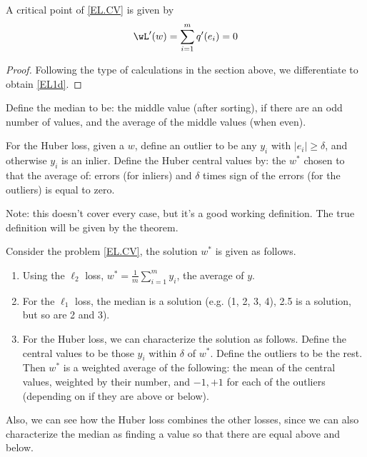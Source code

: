 \documentclass[12pt]{amsart}
\begin{document}
\begin{lemma}
	A critical point of \eqref{EL.CV} is given by 
	\begin{equation}
	\label{EL1d}
	\wL'(w) = \sum_{i=1}^m q'(e_i) = 0
\end{equation}
\end{lemma}
\begin{proof}
Following the type of calculations in the section above, we differentiate to obtain \eqref{EL1d}.
\end{proof}



\begin{definition}
	Define the median to be: the middle value (after sorting),  if there are an odd number of values, and the average of the middle values (when even).  
	
	For the Huber loss, given a $w$, define an outlier to be any $y_i$ with $|e_i| \geq \delta$, and otherwise $y_i$ is an inlier.   Define the Huber central values by: the $w^*$ chosen to that the average of: errors (for inliers) and $\delta$ times sign of the errors (for the outliers) is equal to zero. 
	
	Note: this doesn't cover every case, but it's a good working definition.  The true definition will be given by the theorem. 
	
\end{definition}


\begin{theorem}\label{thm.char.loss}
Consider the problem \eqref{EL.CV}, the solution $w^*$ is given as follows.
\begin{enumerate}
	\item Using the $\ell_2$ loss, $w^* = \frac 1 m \sum_{i=1}^m  y_i$, the average of $y$. 
	\item For the $\ell_1$ loss, the median is a solution (e.g. (1, 2, 3, 4), 2.5 is a solution, but so are 2 and 3). 
	\item For the Huber loss, we can characterize the solution as follows.  Define the central values to be those $y_i$ within $\delta$ of $w^*$.  Define the outliers to be the rest.  Then $w^*$ is a weighted average of the following: the mean of the central values, weighted by their number, and $-1, +1$ for each of the outliers (depending on if they are above or below).
\end{enumerate}




\end{theorem}
Also, we can see how the Huber loss combines the other losses, since we can also characterize the median as finding a value so that there are equal above and below. 
\end{document}
